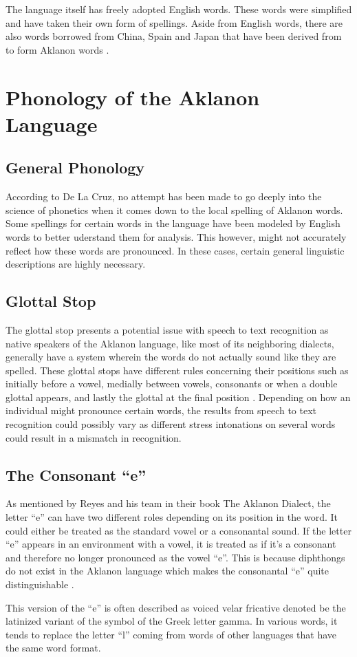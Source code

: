 The language itself has freely adopted English words. These words were simplified and have taken their own form of spellings. Aside from English words, there are also words borrowed from China, Spain and Japan that have been derived from to form Aklanon words \cite{salas1969study}. 

\section{Phonology of the Aklanon Language} 

\subsection{General Phonology}
According to De La Cruz, no attempt has been made to go deeply into the science of phonetics when it comes down to the local spelling of Aklanon words. Some spellings for certain words in the language have been modeled by English words to better uderstand them for analysis. This however, might not accurately reflect how these words are pronounced. In these cases, certain general linguistic descriptions are highly necessary\cite{de1968study}.


\subsection{Glottal Stop}

The glottal stop presents a potential issue with speech to text recognition as native speakers of the Aklanon language, like most of its neighboring dialects, generally have a system wherein the words do not actually sound like they are spelled. These glottal stops have different rules concerning their positions such as initially before a vowel, medially between vowels, consonants or when a double glottal appears, and lastly the glottal at the final position \cite{salas1969study}. Depending on how an individual might pronounce certain words, the results from speech to text recognition could possibly vary as different stress intonations on several words could result in a mismatch in recognition.

\subsection{The Consonant “e”}
As mentioned by Reyes and his team in their book The Aklanon Dialect, the letter “e” can have two different roles depending on its position in the word. It could either be treated as the standard vowel or a consonantal sound. If the letter “e” appears in an environment with a vowel, it is treated as if it’s a consonant and therefore no longer pronounced as the vowel “e”. This is because diphthongs do not exist in the Aklanon language which makes the consonantal “e” quite distinguishable \cite{salas1969study}.

This version of the “e” is often described as voiced velar fricative denoted be the latinized variant of the symbol of the Greek letter gamma. In various words, it tends to replace the letter “l” coming from words of other languages that have the same word format.
